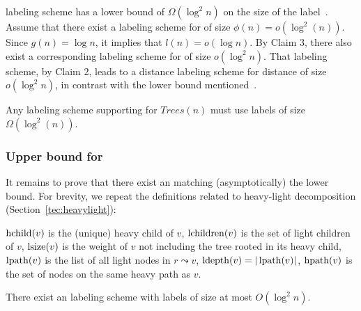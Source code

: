 			\distance labeling scheme has a lower bound of $\Omega(\log^2 n)$ on the size of the label~\cite{gavoillea2004distance}.
			Assume that there exist a labeling scheme for \NCAf  of size $\phi(n) = o(\log^2(n))$. Since $g(n) = \log n$, it implies that $l(n) = o(\log n)$.
			By Claim 3, there also  exist a corresponding labeling scheme for \seplevel of size $o(\log^2 n)$.
			That labeling scheme, by  Claim 2, leads to a distance labeling scheme for distance of size $o(\log^2 n)$, in contrast with the lower bound mentioned~\cite{gavoillea2004distance}.
			
			\begin{corollary}
			Any labeling scheme supporting \NCAf for $Trees(n)$ must use labels of size $\Omega(\log^2(n))$.
			\end{corollary}
			 
\subsubsection{Upper bound for \NCAf}
It remains to prove that  there exist an \NCAf  matching (asymptotically) the lower bound.		 
For brevity, we repeat the definitions related to heavy-light decomposition (Section~\ref{tec:heavylight}):

$\operatorname{hchild}(v)$ is the (unique) heavy child of $v$,
$\operatorname{lchildren}(v)$ is the set of light children of $v$,
$\operatorname{lsize}(v)$ is the weight of $v$ not including the tree rooted in its heavy child,
$\operatorname{lpath}(v)$ is the list of all light nodes in  $r \leadsto v$,
$\operatorname{ldepth}(v) = \vert \operatorname{lpath}(v) \vert$,
$\operatorname{hpath}(v)$ is the set  of nodes on the same heavy path as $v$.


	\begin{theorem}\label{NCA-fixed-upper} \cite{Peleg05}
	There exist an \NCAf labeling scheme with labels of size at most $O(\log^2 n)$.
	\end{theorem}

